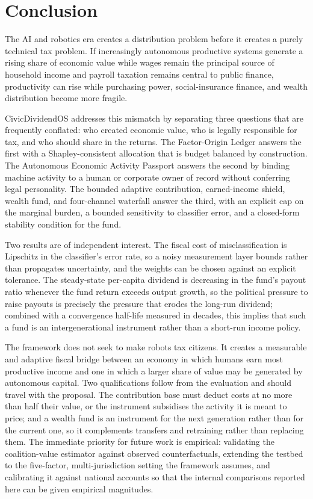 \documentclass[journal]{IEEEtran}
\theoremstyle{plain}
\theoremstyle{definition}
\begin{document}
\section{Conclusion}
\label{sec:conclusion}

The AI and robotics era creates a distribution problem before it creates a purely technical tax problem. If increasingly autonomous productive systems generate a rising share of economic value while wages remain the principal source of household income and payroll taxation remains central to public finance, productivity can rise while purchasing power, social-insurance finance, and wealth distribution become more fragile.

CivicDividendOS addresses this mismatch by separating three questions that are frequently conflated: who created economic value, who is legally responsible for tax, and who should share in the returns. The Factor-Origin Ledger answers the first with a Shapley-consistent allocation that is budget balanced by construction. The Autonomous Economic Activity Passport answers the second by binding machine activity to a human or corporate owner of record without conferring legal personality. The bounded adaptive contribution, earned-income shield, wealth fund, and four-channel waterfall answer the third, with an explicit cap on the marginal burden, a bounded sensitivity to classifier error, and a closed-form stability condition for the fund.

Two results are of independent interest. The fiscal cost of misclassification is Lipschitz in the classifier's error rate, so a noisy measurement layer bounds rather than propagates uncertainty, and the weights can be chosen against an explicit tolerance. The steady-state per-capita dividend is decreasing in the fund's payout ratio whenever the fund return exceeds output growth, so the political pressure to raise payouts is precisely the pressure that erodes the long-run dividend; combined with a convergence half-life measured in decades, this implies that such a fund is an intergenerational instrument rather than a short-run income policy.

The framework does not seek to make robots tax citizens. It creates a measurable and adaptive fiscal bridge between an economy in which humans earn most productive income and one in which a larger share of value may be generated by autonomous capital. Two qualifications follow from the evaluation and should travel with the proposal. The contribution base must deduct costs at no more than half their value, or the instrument subsidises the activity it is meant to price; and a wealth fund is an instrument for the next generation rather than for the current one, so it complements transfers and retraining rather than replacing them. The immediate priority for future work is empirical: validating the coalition-value estimator against observed counterfactuals, extending the testbed to the five-factor, multi-jurisdiction setting the framework assumes, and calibrating it against national accounts so that the internal comparisons reported here can be given empirical magnitudes.



\end{document}
